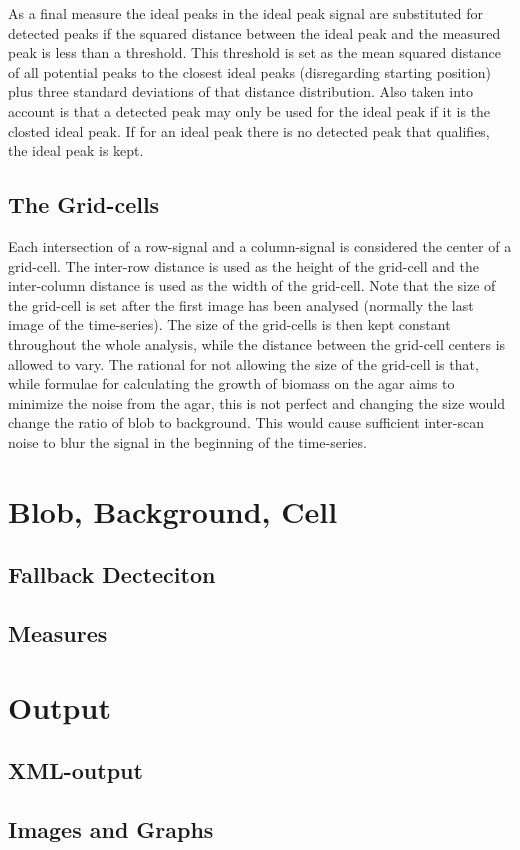 \documentclass{article}
\begin{document}
As a final measure the ideal peaks in the ideal peak signal are 
substituted for detected peaks if the squared distance between the ideal peak
and the measured peak is less than a threshold.
This threshold is set as the mean squared distance of all potential peaks
to the closest ideal peaks (disregarding starting position) plus three
standard deviations of that distance distribution.
Also taken into account is that a detected peak may only be used for the
ideal peak if it is the closted ideal peak.
If for an ideal peak there is no detected peak that qualifies, the ideal
peak is kept.

\subsection{The Grid-cells}

Each intersection of a row-signal and a column-signal is considered the
center of a grid-cell.
The inter-row distance is used as the height of the grid-cell and the 
inter-column distance is used as the width of the grid-cell.
Note that the size of the grid-cell is set after the first image has been
analysed (normally the last image of the time-series).
The size of the grid-cells is then kept constant throughout the whole 
analysis, while the distance between the grid-cell centers is allowed to 
vary. 
The rational for not allowing the size of the grid-cell is that, while
formulae for calculating the growth of biomass on the agar aims to 
minimize the noise from the agar, this is not perfect and changing the 
size would change the ratio of blob to background.
This would cause sufficient inter-scan noise to blur the signal in the 
beginning of the time-series.

\section{Blob, Background, Cell}

\subsection{Fallback Decteciton}

\subsection{Measures}

\section{Output}

\subsection{XML-output}

\subsection{Images and Graphs}
\end{document}
